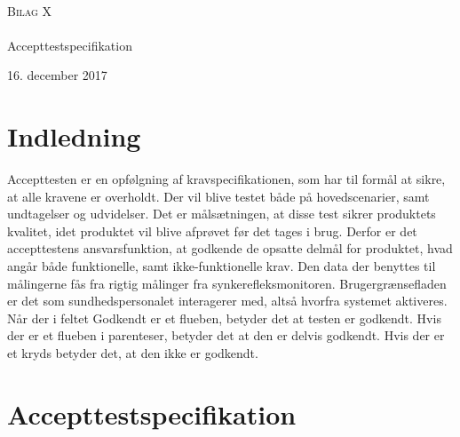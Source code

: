 \documentclass[main.tex]{subfiles}
\begin{document}
\begin{titlingpage}
\begin{center}

~ \\[3cm]


\textsc{\LARGE Bilag X}\\[1.5cm]


\noindent\makebox[\linewidth]{\rule{\textwidth}{0.4pt}}\\
[0.5cm]{\Huge Accepttestspecifikation}
\noindent\makebox[\linewidth]{\rule{\textwidth}{0.4pt}}
\end{center}
\vfill
\begin{center}
{\large 16. december 2017}
\end{center}
\end{titlingpage}

\newpage
\tableofcontents*


\chapter{Indledning}
Accepttesten er en opfølgning af kravspecifikationen, som har til formål at sikre, at alle kravene er overholdt. Der vil blive testet både på hovedscenarier, samt undtagelser og udvidelser. Det er målsætningen, at disse test sikrer produktets kvalitet, idet produktet vil blive afprøvet før det tages i brug. Derfor er det accepttestens ansvarsfunktion, at godkende de opsatte delmål for produktet, hvad angår både funktionelle, samt ikke-funktionelle krav.
Den data der benyttes til målingerne fås fra rigtig målinger fra synkerefleksmonitoren. Brugergrænsefladen er det som sundhedspersonalet interagerer med, altså hvorfra systemet
aktiveres. Når der i feltet Godkendt er et flueben, betyder det at testen er godkendt. Hvis der er et flueben i parenteser, betyder det at den er delvis godkendt. Hvis der er et kryds betyder
det, at den ikke er godkendt.










\chapter{Accepttestspecifikation}
\end{document}
